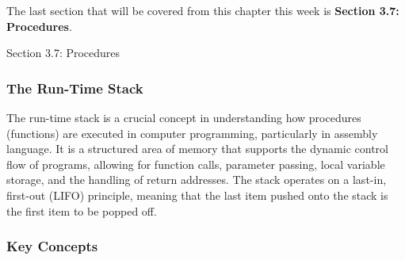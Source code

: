 The last section that will be covered from this chapter this week is \textbf{Section 3.7: Procedures}.

\begin{notes}{Section 3.7: Procedures}
    \subsubsection*{The Run-Time Stack}

    The run-time stack is a crucial concept in understanding how procedures (functions) are executed in computer programming, particularly in assembly language. It is a structured area of memory that 
    supports the dynamic control flow of programs, allowing for function calls, parameter passing, local variable storage, and the handling of return addresses. The stack operates on a last-in, first-out 
    (LIFO) principle, meaning that the last item pushed onto the stack is the first item to be popped off. \vspace*{1em}
    
    \subsubsection*{Key Concepts}
    

\end{notes}
